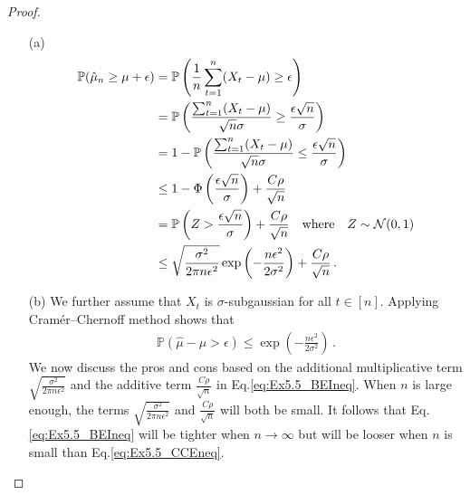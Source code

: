 \begin{proof}
\begin{enumerate}
	\item[(a)] 
	\begin{align}\label{eq:Ex5.5_BEIneq}
	    \mathbb{P}(\hat{\mu}_n\geq \mu+\epsilon)&=\mathbb{P}\left(\frac{1}{n}\sum^n_{t=1}(X_t-\mu)\geq\epsilon\right)\notag\\
	    &=\mathbb{P}\left(\frac{\sum^n_{t=1}(X_t-\mu)}{\sqrt{n}\sigma}\geq\frac{\epsilon\sqrt{n}}{\sigma}\right)\notag\\
	    &=1-\mathbb{P}\left(\frac{\sum^n_{t=1}(X_t-\mu)}{\sqrt{n}\sigma}\leq\frac{\epsilon\sqrt{n}}{\sigma}\right)\notag\\
	    &\leq 1-\Phi\left(\frac{\epsilon\sqrt{n}}{\sigma}\right)+\frac{C\rho}{\sqrt{n}}\notag\\
	    &=\mathbb{P}\left(Z>\frac{\epsilon\sqrt{n}}{\sigma}\right)+\frac{C\rho}{\sqrt{n}}\quad\text{where}\quad Z\sim\mathcal{N}(0,1)\notag\\
	    &\leq\sqrt{\frac{\sigma^2}{2\pi n\epsilon^2}}\exp\left(-\frac{n\epsilon^2}{2\sigma^2}\right)+\frac{C\rho}{\sqrt{n}}\,.
	\end{align}
	\item[(b)] We further assume that $X_t$ is $\sigma$-subgaussian for all $t\in[n]$. Applying Cram{\'e}r–Chernoff method shows that
	\begin{align}\label{eq:Ex5.5_CCEneq}
	    \mathbb{P}(\hat{\mu}-\mu>\epsilon)\leq\exp\left(-\frac{n\epsilon^2}{2\sigma^2}\right)\,.
	\end{align}
	We now discuss the pros and cons based on the additional multiplicative term $\sqrt{\frac{\sigma^2}{2\pi n\epsilon^2}}$ and the additive term $\frac{C\rho}{\sqrt{n}}$ in Eq.\eqref{eq:Ex5.5_BEIneq}. When $n$ is large enough, the terms $\sqrt{\frac{\sigma^2}{2\pi n\epsilon^2}}$ and $\frac{C\rho}{\sqrt{n}}$ will both be small. It follows that Eq.\eqref{eq:Ex5.5_BEIneq} will be tighter when $n\rightarrow \infty$ but will be looser when $n$ is small than Eq.\eqref{eq:Ex5.5_CCEneq}.
\end{enumerate}
\end{proof}


